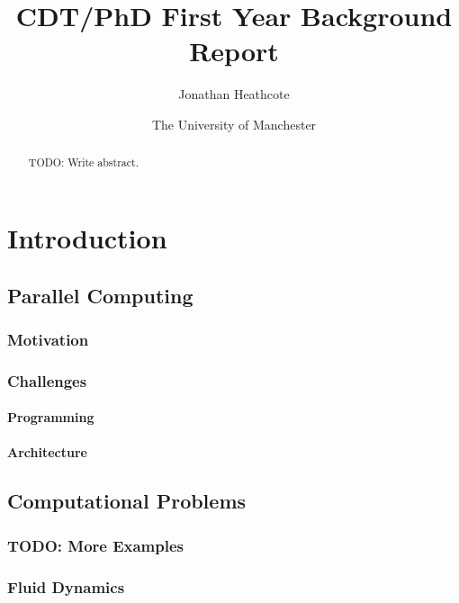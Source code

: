 \documentclass[a4paper,11pt,titlepage]{report}
\title{CDT/PhD First Year Background Report}
\author{Jonathan Heathcote}
\date{The University of Manchester}
\begin{document}
	
	\maketitle
	
	\begin{abstract}
		TODO: Write abstract.
	\end{abstract}
	
	\setcounter{tocdepth}{4}
	\tableofcontents
	
	
	
	\chapter{Introduction}
		
		\section{Parallel Computing}
			
			\subsection{Motivation}
			
			\subsection{Challenges}
				
				\subsubsection{Programming}
				
				\subsubsection{Architecture}
		
		\section{Computational Problems}
			
			\subsection{TODO: More Examples}
			
			\subsection{Fluid Dynamics}
			
\end{document}
